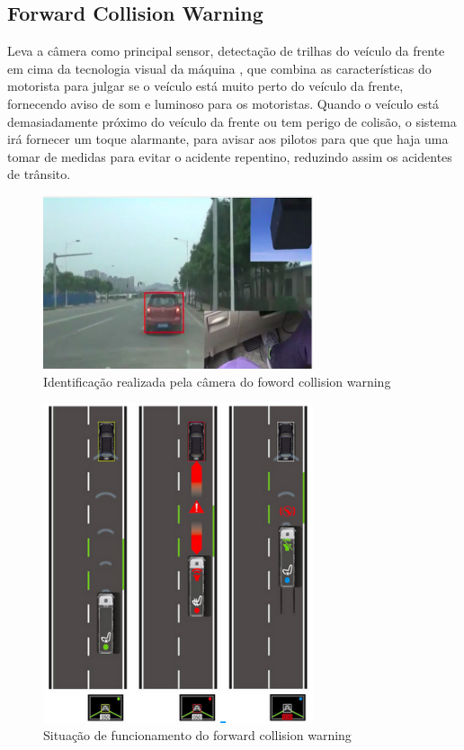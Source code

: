 \subsection{Forward Collision Warning}
Leva a câmera como principal sensor, detectação de trilhas do veículo da frente em cima da tecnologia visual da máquina , que combina as características do motorista para julgar se o veículo está muito perto do veículo da frente, fornecendo aviso de som e luminoso para os motoristas.
Quando o veículo está demasiadamente próximo do veículo da frente ou tem perigo de colisão, o sistema irá fornecer um toque alarmante, para avisar aos pilotos para que que haja uma tomar de medidas para evitar o acidente repentino, reduzindo assim os acidentes de trânsito.

\begin{figure}[h]
  \centering
  \includegraphics[width=300px, scale=0.5]{figuras/fowordCollision}
  \caption{Identificação realizada pela câmera do foword collision warning}
  \label{fig:fowordCollision}
\end{figure}


\begin{figure}[h]
  \centering
  \includegraphics[width=300px, scale=0.5]{figuras/situacaoForwardCollision}
  \caption{Situação de funcionamento do forward collision warning}
  \label{fig:situacaoForwardCollision}
\end{figure}

